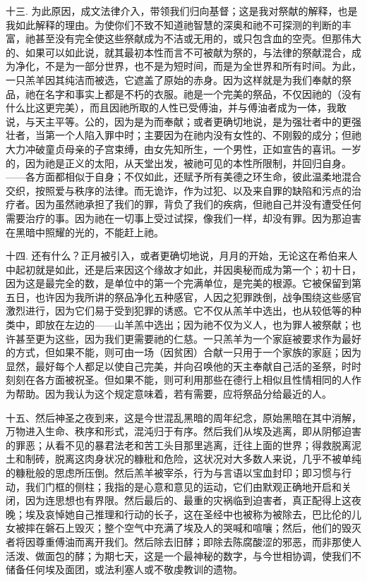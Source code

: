 十三. 为此原因，成文法律介入，带领我们归向基督；这是我对祭献的解释，也是我如此解释的理由。为使你们不致不知道祂智慧的深奥和祂不可探测的判断的丰富，祂甚至没有完全使这些祭献成为不洁或无用的，或只包含血的空壳。但那伟大的、如果可以如此说，就其最初本性而言不可被献为祭的，与法律的祭献混合，成为净化，不是为一部分世界，也不是为短时间，而是为全世界和所有时间。为此，一只羔羊因其纯洁而被选，它遮盖了原始的赤身。因为这样就是为我们奉献的祭品，祂在名字和事实上都是不朽的衣服。祂是一个完美的祭品，不仅因祂的（没有什么比这更完美），而且因祂所取的人性已受傅油，并与傅油者成为一体，我敢说，与天主平等。公的，因为是为而奉献；或者更确切地说，是为强壮者中的更强壮者，当第一个人陷入罪中时；主要因为在祂内没有女性的、不刚毅的成分；但祂大力冲破童贞母亲的子宫束缚，由女先知所生，一个男性，正如宣告的喜讯。一岁的，因为祂是正义的太阳，从天堂出发，被祂可见的本性所限制，并回归自身。——各方面都相似于自身；不仅如此，还赋予所有美德之环生命，彼此温柔地混合交织，按照爱与秩序的法律。而无诡诈，作为过犯、以及来自罪的缺陷和污点的治疗者。因为虽然祂承担了我们的罪，背负了我们的疾病，但祂自己并没有遭受任何需要治疗的事。因为祂在一切事上受过试探，像我们一样，却没有罪。因为那迫害在黑暗中照耀的光的，不能赶上祂。\par

十四. 还有什么？正月被引入，或者更确切地说，月月的开始，无论这在希伯来人中起初就是如此，还是后来因这个缘故才如此，并因奥秘而成为第一个；初十日，因为这是最完全的数，是单位中的第一个完满单位，是完美的根源。它被保留到第五日，也许因为我所讲的祭品净化五种感官，人因之犯罪跌倒，战争围绕这些感官激烈进行，因为它们易于受到犯罪的诱惑。它不仅从羔羊中选出，也从较低等的种类中，即放在左边的——山羊羔中选出；因为祂不仅为义人，也为罪人被祭献；也许甚至更为这些，因为我们更需要祂的仁慈。一只羔羊为一个家庭被要求作为最好的方式，但如果不能，则可由一场（因贫困）合献一只用于一个家族的家庭；因为显然，最好每个人都足以使自己完美，并向召唤他的天主奉献自己活的圣祭，时时刻刻在各方面被祝圣。但如果不能，则可利用那些在德行上相似且性情相同的人作为帮助。因为我认为这个规定意味着，若有需要，应将祭品分给最近的人。\par

十五、然后神圣之夜到来，这是今世混乱黑暗的周年纪念，原始黑暗在其中消解，万物进入生命、秩序和形式，混沌归于有序。然后我们从埃及逃离，即从阴郁迫害的罪恶；从看不见的暴君法老和苦工头目那里逃离，迁往上面的世界；得救脱离泥土和制砖，脱离这肉身状况的糠秕和危险，这状况对大多数人来说，几乎不被单纯的糠秕般的思虑所压倒。然后羔羊被宰杀，行为与言语以宝血封印；即习惯与行动，我们门框的侧柱；我指的是心意和意见的运动，它们由默观正确地开启和关闭，因为连思想也有界限。然后最后的、最重的灾祸临到迫害者，真正配得上这夜晚；埃及哀悼她自己推理和行动的长子，这在圣经中也被称为被除去，巴比伦的儿女被摔在磐石上毁灭；整个空气中充满了埃及人的哭喊和喧嚷；然后，他们的毁灭者将因尊重傅油而离开我们。然后除去旧酵；即除去陈腐酸涩的邪恶，而非那使人活泼、做面包的酵；为期七天，这是一个最神秘的数字，与今世相协调，使我们不储备任何埃及面团，或法利塞人或不敬虔教训的遗物。\par

